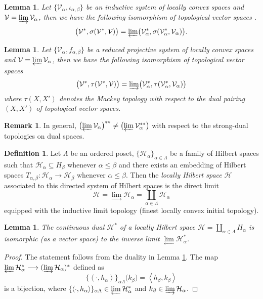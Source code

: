 \documentclass[10pt]{article}
\newtheorem{lemma}[theorem]{Lemma}
\theoremstyle{definition}
\newtheorem{remark}{Remark}[section]
\newtheorem{definition}{Definition}[section]
\begin{document}
	\begin{lemma}\label{dualdir}
		Let $\{\mathcal V_\alpha, \iota_{\alpha,\beta}\}$ be an inductive system of locally convex spaces and $\mathcal V=\varinjlim \mathcal V_\alpha$, then we have the following isomorphism of topological vector spaces \cite[IV.4.5]{Schaefer}. $$\bigl(\mathcal V^*,\sigma(\mathcal V^*,\mathcal V)\bigr)=\varprojlim \bigl(\mathcal V_\alpha^*,\sigma(\mathcal V_\alpha^*,\mathcal V_\alpha)\bigr).$$
	\end{lemma}
	\begin{lemma} Let $\{\mathcal V_\alpha, f_{\alpha,\beta}\}$ be a reduced projective system of locally convex spaces and $\mathcal V=\varprojlim \mathcal V_\alpha$, then we have the following isomorphism of topological vector spaces $$ \bigl(\mathcal V^*,\tau (\mathcal V^*, \mathcal V)\bigr)=\varinjlim \bigl(\mathcal V_\alpha^*, \tau(\mathcal V_\alpha^*, \mathcal V_\alpha)\bigr)$$ 
		where $\tau(X,X')$ denotes the Mackey topology with respect to the dual pairing $(X,X')$ of topological vector spaces. {\cite[IV.4.4]{Schaefer}}
		\end{lemma}
			\begin{remark}
			In general,  $\bigl(\varprojlim \mathcal V_\alpha\bigr)^{**}\neq \bigl(\varprojlim \mathcal V_\alpha^{**}\bigr)$ with respect to the strong-dual topologies on dual spaces.
		\end{remark}
		\begin{definition}
		Let $\Lambda$ be an ordered poset, $\{\mathcal H_\alpha\}_{\alpha\in \Lambda}$ be a family of Hilbert spaces such that $\mathcal H_\alpha\subseteq H_\beta$ whenever $\alpha\leq \beta$ and there exists an embedding of Hilbert spaces $T_{\alpha,\beta}:\mathcal H_\alpha\to \mathcal H_\beta$ whenever $\alpha\leq \beta$. Then the \emph{locally Hilbert space} $\mathcal H$ associated to this directed system of Hilbert spaces is the direct limit $$\mathcal H=\underset{\longrightarrow}{\lim}\mathcal H_\alpha=\coprod_{\alpha\in \Lambda} \mathcal H_\alpha$$
		equipped with the inductive limit topology (finest locally convex initial topology).
	\end{definition}
	\begin{lemma}\label{limdual}
		The continuous dual $\mathcal H^*$ of a locally Hilbert space $\mathcal H=\coprod_{\alpha\in \Lambda} H_\alpha$ is isomorphic (as a vector space) to the inverse limit $\underset{\longleftarrow}{\lim}\mathcal H_\alpha^*$.
	\end{lemma}
	\begin{proof}
		The statement follows from the duality in Lemma \ref{dualdir}. The map $\varprojlim \mathcal H_\alpha^*\longrightarrow(\varinjlim \mathcal H_\alpha)^*$ defined as $$\{\left<\cdot,h_\alpha\right>\}_{\alpha\Lambda}\bigl( k_\beta\bigr)=\left<h_\beta,k_\beta\right>$$ is a bijection, where $\{\left<\cdot,h_\alpha\right>\}_{\alpha\Lambda}\in \varprojlim\mathcal H_\alpha^*$ and $k_\beta\in \varinjlim\mathcal H_\alpha$.
	\end{proof}
\end{document}
